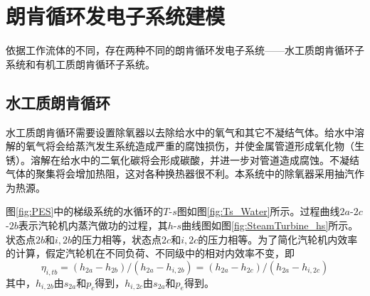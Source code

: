 
\section{朗肯循环发电子系统建模}
依据工作流体的不同，存在两种不同的朗肯循环发电子系统——水工质朗肯循环子系统和有机工质朗肯循环子系统。

\subsection{水工质朗肯循环}
  
  水工质朗肯循环需要设置除氧器以去除给水中的氧气和其它不凝结气体。给水中溶解的氧气将会给蒸汽发生系统造成严重的腐蚀损伤，并使金属管道形成氧化物（生锈）。溶解在给水中的二氧化碳将会形成碳酸，并进一步对管道造成腐蚀。不凝结气体的聚集将会增加热阻，这对各种换热器很不利。本系统中的除氧器采用抽汽作为热源。
  
  图\ref{fig:PES}中的梯级系统的水循环的$T$-$s$图如图\ref{fig:Ts_Water}所示。过程曲线$2a$-$2c$-$2b$表示汽轮机内蒸汽做功的过程，其$h$-$s$曲线图如图\ref{fig:SteamTurbine_hs}所示。状态点$2b$和$i,2b$的压力相等，状态点$2c$和$i,2c$的压力相等。为了简化汽轮机内效率的计算，假定汽轮机在不同负荷、不同级中的相对内效率不变，即
\begin{equation}
      \eta_{i,tb} =(h_{2a}-h_{2b})/(h_{2a}-h_{i,2b}) = (h_{2a}-h_{2c})/(h_{2a}-h_{i,2c})
\end{equation}
其中，$h_{i,2b}$由$s_{2a}$和$p_c$得到，$h_{i,2c}$由$s_{2a}$和$p_e$得到。

